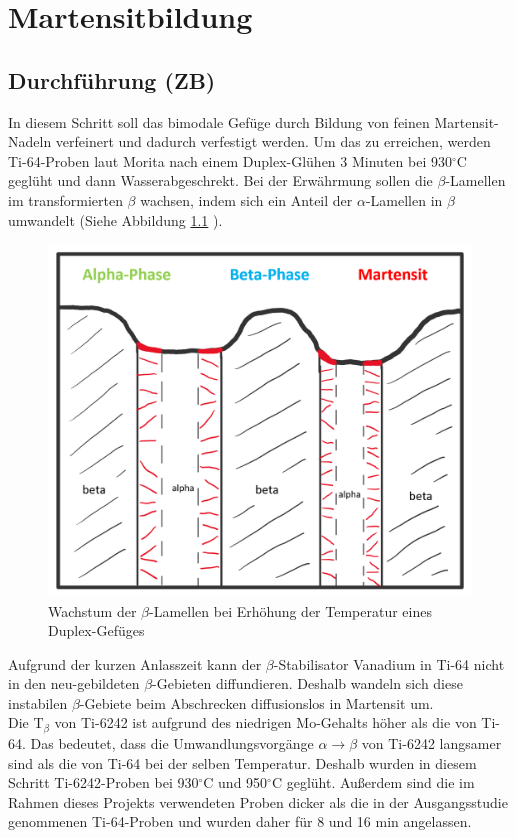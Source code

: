 \chapter{Martensitbildung}
\label{MB1}

\section{Durchführung (ZB)}

In diesem Schritt soll das bimodale Gefüge durch Bildung von feinen Martensit-Nadeln verfeinert und dadurch verfestigt werden. Um das zu erreichen, werden Ti-64-Proben laut Morita \cite{Morita.2005} nach einem Duplex-Glühen 3 Minuten bei 930$^\circ$C geglüht und dann Wasserabgeschrekt. Bei der Erwährmung sollen die $\beta$-Lamellen im transformierten $\beta$ wachsen, indem sich ein Anteil der $\alpha$-Lamellen in $\beta$ umwandelt (Siehe Abbildung \ref{fig:martensit-einzeln} ).

\begin{figure}[h]
	\centering
	\includegraphics[width=0.7\linewidth]{./Bilder/Martensit einzeln.png}
	\caption{Wachstum der $\beta$-Lamellen bei Erhöhung der Temperatur eines Duplex-Gefüges}
	\label{fig:martensit-einzeln}
\end{figure}

Aufgrund der kurzen Anlasszeit kann der $\beta$-Stabilisator Vanadium in Ti-64 nicht in den neu-gebildeten $\beta$-Gebieten diffundieren. Deshalb wandeln sich diese instabilen $\beta$-Gebiete beim Abschrecken diffusionslos in Martensit um.\\

Die T$_\beta$ von Ti-6242 ist aufgrund des niedrigen Mo-Gehalts höher als die von Ti-64. Das bedeutet, dass die Umwandlungsvorgänge $\alpha\rightarrow\beta$ von Ti-6242 langsamer sind als die von Ti-64 bei der selben Temperatur. Deshalb wurden in diesem Schritt Ti-6242-Proben bei 930$^\circ$C und 950$^\circ$C  geglüht. Außerdem sind die im Rahmen dieses Projekts verwendeten Proben dicker als die in der Ausgangsstudie \cite{Morita.2005} genommenen Ti-64-Proben und wurden daher für 8 und 16 min angelassen.

